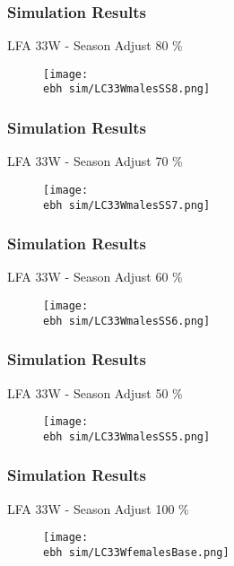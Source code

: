 \documentclass{beamer}
\newcommand{\ebh}{\string~/bio.data/bio.lobster/figures/LFA2733Framework2018/} %
\begin{document}
\begin{frame}
\frametitle{Simulation Results}
LFA 33W - Season Adjust 80 \%
\begin{figure}
        \begin{center}
            \texttt{[image: \\ebh sim/LC33WmalesSS8.png]}
        \end{center}
    \end{figure}
\end{frame}


\begin{frame}
\frametitle{Simulation Results}
LFA 33W - Season Adjust 70 \%
\begin{figure}
        \begin{center}
            \texttt{[image: \\ebh sim/LC33WmalesSS7.png]}
        \end{center}
    \end{figure}
\end{frame}


\begin{frame}
\frametitle{Simulation Results}
LFA 33W - Season Adjust 60 \%
\begin{figure}
        \begin{center}
            \texttt{[image: \\ebh sim/LC33WmalesSS6.png]}
        \end{center}
    \end{figure}
\end{frame}


\begin{frame}
\frametitle{Simulation Results}
LFA 33W - Season Adjust 50 \%
\begin{figure}
        \begin{center}
            \texttt{[image: \\ebh sim/LC33WmalesSS5.png]}
        \end{center}
    \end{figure}
\end{frame}




\begin{frame}
\frametitle{Simulation Results}
LFA 33W - Season Adjust 100 \%
\begin{figure}
        \begin{center}
            \texttt{[image: \\ebh sim/LC33WfemalesBase.png]}
        \end{center}
    \end{figure}
\end{frame}
\end{document}
